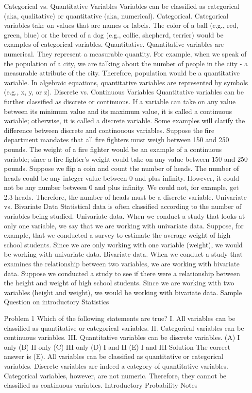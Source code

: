 

Categorical vs. Quantitative Variables
Variables can be classified as categorical (aka, qualitative) or quantitative (aka, numerical).
Categorical. Categorical variables take on values that are names or labels. The color of a ball (e.g., red, green, blue) or the breed of a dog (e.g., collie, shepherd, terrier) would be examples of categorical variables. 
Quantitative. Quantitative variables are numerical. They represent a measurable quantity. For example, when we speak of the population of a city, we are talking about the number of people in the city - a measurable attribute of the city. Therefore, population would be a quantitative variable.
In algebraic equations, quantitative variables are represented by symbols (e.g., x, y, or z).
Discrete vs. Continuous Variables
Quantitative variables can be further classified as discrete or continuous. If a variable can take on any value between its minimum value and its maximum value, it is called a continuous variable; otherwise, it is called a discrete variable.
Some examples will clarify the difference between discrete and continouous variables.
Suppose the fire department mandates that all fire fighters must weigh between 150 and 250 pounds. The weight of a fire fighter would be an example of a continuous variable; since a fire fighter's weight could take on any value between 150 and 250 pounds. 
Suppose we flip a coin and count the number of heads. The number of heads could be any integer value between 0 and plus infinity. However, it could not be any number between 0 and plus infinity. We could not, for example, get 2.3 heads. Therefore, the number of heads must be a discrete variable.
Univariate vs. Bivariate Data
Statistical data is often classified according to the number of variables being studied.
Univariate data. When we conduct a study that looks at only one variable, we say that we are working with univariate data. Suppose, for example, that we conducted a survey to estimate the average weight of high school students. Since we are only working with one variable (weight), we would be working with univariate data.
Bivariate data. When we conduct a study that examines the relationship between two variables, we are working with bivariate data. Suppose we conducted a study to see if there were a relationship between the height and weight of high school students. Since we are working with two variables (height and weight), we would be working with bivariate data.
Sample Question on introductory Statistics

Problem 1
Which of the following statements are true?
I. All variables can be classified as quantitative or categorical variables. 
II. Categorical variables can be continuous variables. 
III. Quantitative variables can be discrete variables.
(A) I only 
(B) II only 
(C) III only 
(D) I and II 
(E) I and III
Solution
The correct answer is (E). All variables can be classified as quantitative or categorical variables. Discrete variables are indeed a category of quantitative variables. Categorical variables, however, are not numeric. Therefore, they cannot be classified as continuous variables.
Introductory Probability Notes
